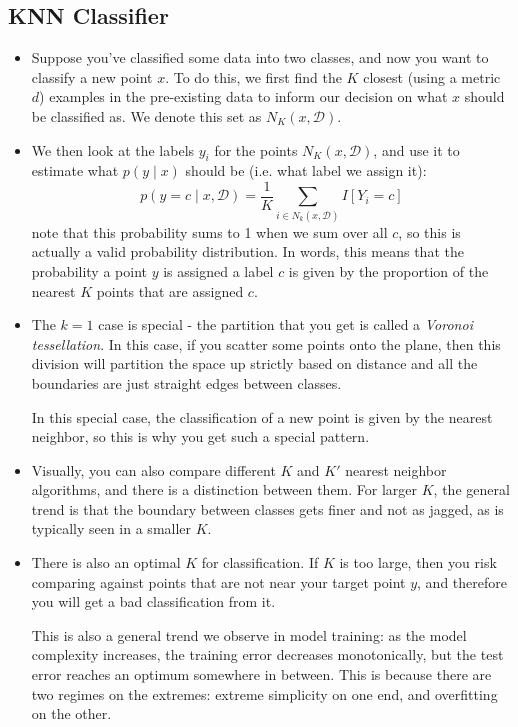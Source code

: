 \subsection{KNN Classifier}
\begin{itemize}
	\item Suppose you've classified some data into two classes, and now you want to classify a new point \( x
		\). To do this, we first find the \( K \) closest (using a metric \( d \)) examples in the
		pre-existing data to inform our decision on what \( x \) should be classified as. We denote this set
		as \( N_K(x, \mathcal{D}) \). 

	\item We then look at the labels \( y_i \) for the points \( N_K(x, \mathcal{D}) \), and use it to
		estimate what \( p(y \mid x)  \) should be (i.e. what label we assign it):
		\[
			p(y = c \mid x, \mathcal{D}) = \frac{1}{K}\sum_{i \in N_k(x, \mathcal{D})} I[Y_i = c]
		\]
		note that this probability sums to 1 when we sum over all \( c \), so this is actually a valid
		probability distribution. In words, this means that the probability a point \( y \) is assigned a
		label \( c \) is given by the proportion of the nearest \( K \) points that are assigned \( c \).
	\item The \( k = 1 \) case is special - the partition that you get is called a \textit{Voronoi
		tessellation}. In this case, if you scatter some points onto the plane, then this division will
		partition the space up strictly based on distance and all the boundaries are just straight edges
		between classes.  

		In this special case, the classification of a new point is given by the nearest neighbor, so this is
		why you get such a special pattern.


	\item Visually, you can also compare different \( K \) and \( K' \) nearest neighbor algorithms, and
		there is a distinction between them. For larger \( K \), the general trend is that the boundary
		between classes gets finer and not as jagged, as is typically seen in a smaller \( K \).  
	\item There is also an optimal \( K \) for classification. If \( K \) is too large, then you risk
		comparing against points that are not near your target point \( y \), and therefore you will get a
		bad classification from it. 

		This is also a general trend we observe in model training: as the model complexity increases, the
		training error decreases monotonically, but the test error reaches an optimum somewhere in between.
		This is because there are two regimes on the extremes: extreme simplicity on one end, and overfitting
		on the other. 
\end{itemize}


